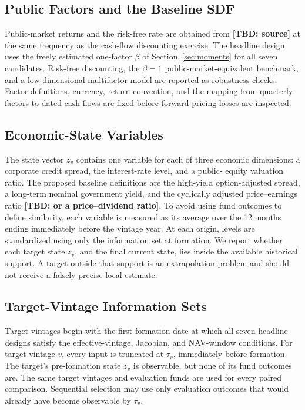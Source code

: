 \documentclass[11pt]{article}
\newcommand{\tbd}[1]{\textbf{[TBD: #1]}}
\begin{document}
\subsection{Public Factors and the Baseline SDF}

Public-market returns and the risk-free rate are obtained from \tbd{source} at
the same frequency as the cash-flow discounting exercise. The headline design
uses the freely estimated one-factor $\beta$ of Section~\ref{sec:moments} for
all seven candidates. Risk-free discounting, the $\beta=1$
public-market-equivalent benchmark, and a low-dimensional multifactor model are
reported as robustness checks. Factor definitions, currency, return convention,
and the mapping from quarterly factors to dated cash flows are fixed before
forward pricing losses are inspected.

\subsection{Economic-State Variables}

The state vector $z_v$ contains one variable for each of three economic
dimensions: a corporate credit spread, the interest-rate level, and a public-
equity valuation ratio. The proposed baseline definitions are the high-yield
option-adjusted spread, a long-term nominal government yield, and the cyclically
adjusted price--earnings ratio \tbd{or a price--dividend ratio}. To avoid using
fund outcomes to define similarity, each variable is measured as its average
over the 12 months ending immediately before the vintage year. At each origin,
levels are standardized using only the information set at formation. We report
whether each target state $z_v$, and the final current state, lies inside the
available historical support. A target outside that support is an extrapolation
problem and should not receive a falsely precise local estimate.

\subsection{Target-Vintage Information Sets}

Target vintages begin with the first formation date at which all seven
headline designs satisfy the effective-vintage, Jacobian, and NAV-window
conditions. For target
vintage $v$, every input is truncated at $\tau_v$, immediately before
formation. The target's pre-formation state $z_v$ is observable, but none of
its fund outcomes are. The same target vintages and evaluation funds are used
for every paired comparison. Sequential selection may use only evaluation
outcomes that would already have become observable by $\tau_v$.
\end{document}
